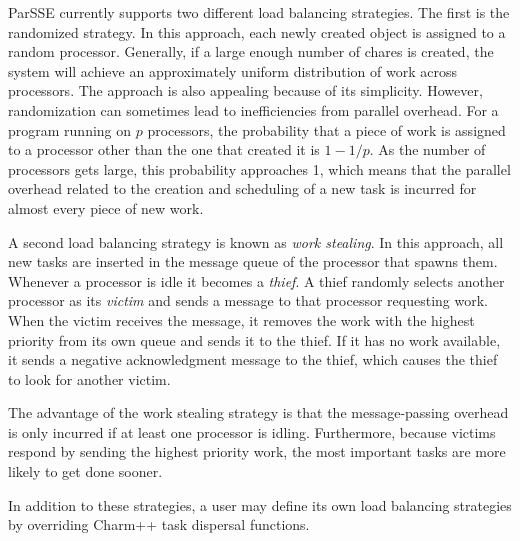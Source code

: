 \documentclass[times, 10pt,twocolumn]{article}
\begin{document}
{\sc ParSSE} currently supports two different load balancing strategies.  The
first is the randomized strategy.  In this approach, each newly created object
is assigned to a random processor.  Generally, if a large enough number of 
chares is created, the system will achieve an approximately uniform
distribution of work across processors.  The approach is also appealing because
of its simplicity. However, randomization can sometimes lead to inefficiencies
from parallel overhead.  For a program running on $p$ processors, the
probability that a piece of work is assigned to a processor other than the
one that created it is $1-1/p$.  As the number of processors gets large, this
probability approaches 1, which means that the parallel overhead related to the
creation and scheduling of a new task is incurred for almost every piece of new
work.
 
A second load balancing strategy is known as {\em work stealing}.  In this
approach, all new tasks are inserted in the message queue of the processor that
spawns them.  Whenever a processor is idle it becomes a {\em thief}.  A thief
randomly selects another processor as its {\em victim} and sends a message to
that processor requesting work.  When the victim receives the message, it
removes the work with the highest priority from its own queue and sends it to
the thief.  If it has no work available, it sends a negative acknowledgment
message to the thief, which causes the thief to look for another victim.

The advantage of the work stealing strategy is that the message-passing
overhead is only incurred if at least one processor is idling.  Furthermore,
because victims respond by sending the highest priority work, the most
important tasks are more likely to get done sooner.  

In addition to these strategies, a user may define its own load balancing
strategies by overriding {\sc Charm++} task dispersal functions.
\end{document}
